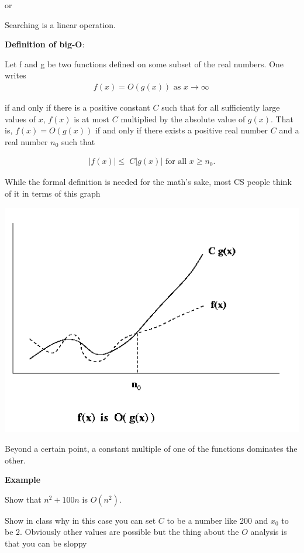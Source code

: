 \documentclass[12pt]{article}
\begin{document}
or 

Searching is a linear operation.

\textbf{Definition of big-O}: 

Let f and g be two functions defined on some subset of the real numbers. One writes
\begin{align*}
f(x)=O(g(x))\text{ as }x\to\infty\,
\end{align*}

if and only if there is a positive constant $C$ such that for all sufficiently large values of $x$, $f(x)$ is at most $C$ multiplied by the absolute value of $g(x)$. That is, $f(x) = O(g(x))$ if and only if there exists a positive real number $C$ and a real number $n_0$ such that

\begin{align*}
|f(x)| \le \; C |g(x)|\text{ for all }x \ge n_0.
\end{align*}

While the formal definition is needed for the math's sake, most CS people think of it in terms of this graph

\includegraphics[scale=0.5]{bigO.png}

Beyond a certain point, a constant multiple of one of the functions dominates the other.

\medskip

\textbf{Example}

Show that $n^2 + 100n$ is $O(n^2)$.

\medskip

Show in class why in this case you can set $C$ to be a number like 200 and $x_0$ to be $2$. Obviously other values are possible but the thing about the $O$ analysis is that you can be sloppy
\end{document}
